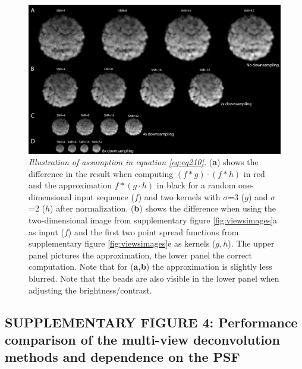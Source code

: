 \documentclass[]{spie}  %
\newcommand\fig{supplementary figure }
\begin{document}
\begin{figure}[h!]
\includegraphics[width=\textwidth]{fig-downsampling.png}
\vspace{-2.0mm}
\caption{\hspace{-0.5mm}\emph{Illustration of assumption in equation \ref{eq:eq210}.} (\textbf{a}) shows the difference in the result when computing $( f \ast g ) \cdot ( f \ast h )$ in red and the approximation $f \ast ( g \cdot h )$ in black for a random one-dimensional input sequence ($f$) and two kernels with $\sigma$=3 ($g$) and $\sigma$=2 ($h$) after normalization. (\textbf{b}) shows the difference when using the two-dimensional image from \fig \ref{fig:viewsimages}a as input ($f$) and the first two point spread functions from \fig \ref{fig:viewsimages}e as kernels ($g,h$). The upper panel pictures the approximation, the lower panel the correct computation. Note that for (\textbf{a,b}) the approximation is slightly less blurred. Note that the beads are also visible in the lower panel when adjusting the brightness/contrast.
}\label{fig:downsampling}
\end{figure}

\pagebreak

\subsection*{SUPPLEMENTARY FIGURE 4: Performance comparison of the multi-view deconvolution methods and dependence on the PSF}

\vspace{1mm}
\end{document}
